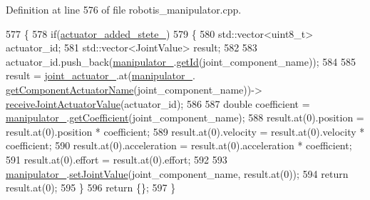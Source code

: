 Definition at line 576 of file robotis\+\_\+manipulator.\+cpp.


\begin{DoxyCode}
577 \{
578   \textcolor{keywordflow}{if}(\hyperlink{classrobotis__manipulator_1_1_robotis_manipulator_a02073b7982b992642b28acfa35a17769}{actuator\_added\_stete\_})
579   \{
580     std::vector<uint8\_t> actuator\_id;
581     std::vector<JointValue> result;
582 
583     actuator\_id.push\_back(\hyperlink{classrobotis__manipulator_1_1_robotis_manipulator_a5b2df4a3b3ee7f408cb1d0eaf61644dc}{manipulator\_}.\hyperlink{classrobotis__manipulator_1_1_manipulator_a60db34ef6a62e0b15aa36f9b1571640d}{getId}(joint\_component\_name));
584 
585     result = \hyperlink{classrobotis__manipulator_1_1_robotis_manipulator_a54dfb941bb2682d321daea25a373ab1c}{joint\_actuator\_}.at(\hyperlink{classrobotis__manipulator_1_1_robotis_manipulator_a5b2df4a3b3ee7f408cb1d0eaf61644dc}{manipulator\_}.
      \hyperlink{classrobotis__manipulator_1_1_manipulator_a371446cbf4d2d5a572b173d713305fb1}{getComponentActuatorName}(joint\_component\_name))->
      \hyperlink{classrobotis__manipulator_1_1_robotis_manipulator_a9ebd6f9d02c16ad41eebf0104a9f69cd}{receiveJointActuatorValue}(actuator\_id);
586 
587     \textcolor{keywordtype}{double} coefficient = \hyperlink{classrobotis__manipulator_1_1_robotis_manipulator_a5b2df4a3b3ee7f408cb1d0eaf61644dc}{manipulator\_}.\hyperlink{classrobotis__manipulator_1_1_manipulator_a437ac5f137aa788c4db07690c185e9ba}{getCoefficient}(joint\_component\_name);
588     result.at(0).position = result.at(0).position * coefficient;
589     result.at(0).velocity = result.at(0).velocity * coefficient;
590     result.at(0).acceleration = result.at(0).acceleration * coefficient;
591     result.at(0).effort = result.at(0).effort;
592 
593     \hyperlink{classrobotis__manipulator_1_1_robotis_manipulator_a5b2df4a3b3ee7f408cb1d0eaf61644dc}{manipulator\_}.\hyperlink{classrobotis__manipulator_1_1_manipulator_aa740b17551040520851ec8dc1d619bfe}{setJointValue}(joint\_component\_name, result.at(0));
594     \textcolor{keywordflow}{return} result.at(0);
595   \}
596   \textcolor{keywordflow}{return} \{\};
597 \}
\end{DoxyCode}



